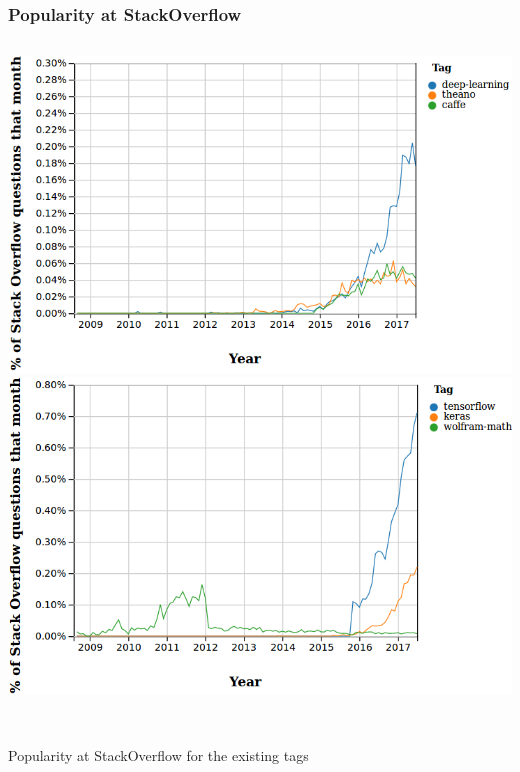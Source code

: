 \documentclass[hyperref={pdfpagelabels=false}]{beamer}
\begin{document}
      \begin{frame}
        \frametitle{Popularity at StackOverflow}
       \begin{columns}
         \centering
         \includegraphics[scale=0.24]{SO_dl_theano_caffe.png}
         \centering
         \includegraphics[scale=0.24]{SO_tf_keras_wolfram.png}
       \end{columns}
       \vspace{5mm}
       \centering
       \scriptsize{\\Popularity at StackOverflow for the existing tags\cite{so-trends}}
      \end{frame}
\end{document}
